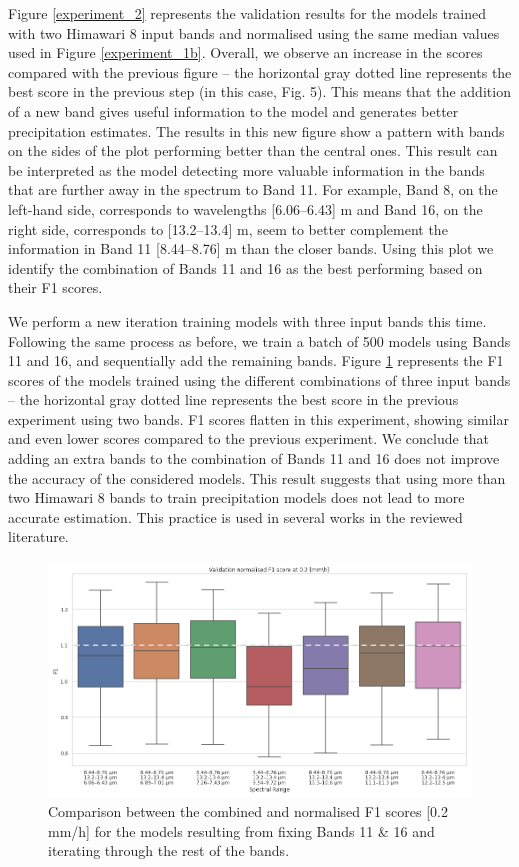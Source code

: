 \documentclass[3p,times]{elsarticle}
\begin{document}
Figure \ref{experiment_2} represents the validation results for the models trained with two Himawari 8 input bands and normalised using the same median values used in Figure \ref{experiment_1b}. Overall, we observe an increase in the scores compared with the previous figure -- the horizontal gray dotted line represents the best score in the previous step (in this case, Fig. 5). This means that the addition of a new band gives useful information to the model and generates better precipitation estimates. The results in this new figure show a pattern with bands on the sides of the plot performing better than the central ones. This result can be interpreted as the model detecting more valuable information in the bands that are further away in the spectrum to Band 11. For example, Band 8, on the left-hand side, corresponds to wavelengths [6.06–6.43] \textmu m and Band 16, on the right side, corresponds to [13.2–13.4] \textmu m, seem to better complement the information in Band 11 [8.44–8.76] \textmu m than the closer bands. Using this plot we identify the combination of Bands 11 and 16 as the best performing based on their F1 scores.

We perform a new iteration training models with three input bands this time. Following the same process as before, we train a batch of 500 models using Bands 11 and 16, and sequentially add the remaining bands. Figure \ref{experiment_3} represents the F1 scores of the models trained using the different combinations of three input bands -- the horizontal gray dotted line represents the best score in the previous experiment using two bands. F1 scores flatten in this experiment, showing similar and even lower scores compared to the previous experiment. We conclude that adding an extra bands to the combination of Bands 11 and 16 does not improve the accuracy of the considered models. This result suggests that using more than two Himawari 8 bands to train precipitation models does not lead to more accurate estimation. This practice is used in several works in the reviewed literature.

\begin{figure}%
    \includegraphics[width=14cm]{figure4.png}
    \caption{Comparison between the combined and normalised F1 scores [0.2 mm/h] for the models resulting from fixing Bands 11 \& 16 and iterating through the rest of the bands.}%
    \label{experiment_3}%
\end{figure}
\end{document}
